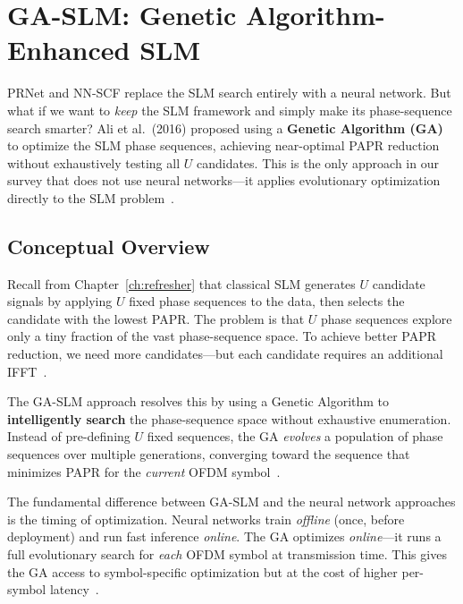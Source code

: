 \chapter{GA-SLM: Genetic Algorithm-Enhanced SLM}
\label{ch:ga_slm}

\begin{motivation}
    PRNet and NN-SCF replace the SLM search entirely with a neural network.
    But what if we want to \emph{keep} the SLM framework and simply make its
    phase-sequence search smarter?
    Ali et al.\ (2016) proposed using a \textbf{Genetic Algorithm (GA)} to
    optimize the SLM phase sequences, achieving near-optimal PAPR reduction
    without exhaustively testing all $U$ candidates.
    This is the only approach in our survey that does not use neural
    networks---it applies evolutionary optimization directly to
    the SLM problem~\cite{ali2016new}.
\end{motivation}


\section{Conceptual Overview}
\label{sec:gaslm_concept}

Recall from Chapter~\ref{ch:refresher} that classical SLM generates $U$
candidate signals by applying $U$ fixed phase sequences to the data, then
selects the candidate with the lowest PAPR.  The problem is that $U$
phase sequences explore only a tiny fraction of the vast phase-sequence
space.  To achieve better PAPR reduction, we need more candidates---but
each candidate requires an additional IFFT~\cite{ali2016new}.

The GA-SLM approach resolves this by using a Genetic Algorithm to
\textbf{intelligently search} the phase-sequence space without exhaustive
enumeration.  Instead of pre-defining $U$ fixed sequences, the GA
\emph{evolves} a population of phase sequences over multiple generations,
converging toward the sequence that minimizes PAPR for the \emph{current}
OFDM symbol~\cite{ali2016new}.

\begin{keyinsight}
    The fundamental difference between GA-SLM and the neural network
    approaches is the timing of optimization.
    Neural networks train \emph{offline} (once, before deployment) and
    run fast inference \emph{online}.
    The GA optimizes \emph{online}---it runs a full evolutionary search
    for \emph{each} OFDM symbol at transmission time.
    This gives the GA access to symbol-specific optimization but at the
    cost of higher per-symbol latency~\cite{ali2016new}.
\end{keyinsight}


